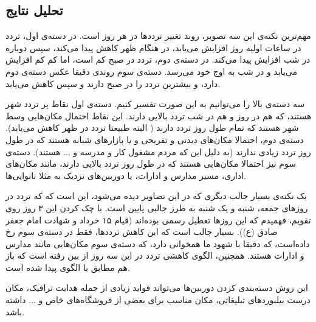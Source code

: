 \subsection{تحلیل نتایج}

مهم‌ترین نکته‌ی این سه تصویر، روند تغییر تردد‌ها در هر روز است. در دسته‌ی اول، 
تردد در ساعات اولیه روز افزایش می‌یابد، در هنگام ظهر کاهش پیدا می‌کند، سپس دوباره در 
شب افزایش پیدا می‌کند. در دسته‌ی دوم، تردد در صبح کم است، اما کم کم افزایش می‌یابد و در شب 
به اوج خود می‌رسد. دسته‌ی سوم روندی دقیقا عکس دسته‌ی دوم دارد، و بیشترین تردد را در صبح 
دارند و سپس کاهش می‌یابد. 

سه دسته‌ی بالا را می‌توانیم به این صورت تفسیر کنیم. دسته‌ی اول نقاط پر تردد شهر هستند، که هم در روز 
و هم در شب تردد بالایی دارند. این نقاط احتمال مکان‌هایی وسط شهر هستند که تمام 
طول روز تردد دارند ( البته طبیعتا تردد در ظهر کاهش می‌یابد). 
دسته‌ی دوم، احتمالا مکان‌های دیدنی و تفریحی و یا بازار‌های شبانه هستند 
که در طول روز تردد زیادی ندارند (به دلیل این که مردم مشغول کار و مدرسه و ... هستند). 
دسته‌ی سوم نیز احتمالا مکان‌هایی هستند که در طول روز تردد بالایی دارند، مانند مکان‌های اداری، مسیر مدارس و ادارات، یا دوربین‌های نزدیک به مثلا نانوایی‌ها. 

یک نکته‌ی بسیار جالب دیگری که در این تصاویر دیده می‌شود، این است که که تردد 
در روز‌های جمعه، شنبه و یک شنبه به طرز جالبی پایین است. با چک کردن این ۳ روز روی تقویم، فهمیدم که این روز‌ها 
تعطیل رسمی بوده‌اند (قیام ۱۵ خرداد و شهادت امام جعفر صادق (ع)). بسیار جالب است که این کاهش 
ترددها، فقط در دسته‌ی سوم رخ داده‌است، که دقیقا با شهود ما همخوانی دارد، که دسته‌ی سوم مکان‌هایی 
مانند مدارس و ادارات هستند. همچنین، الگوی کاهشی تردد در این سه روز از بین رفته‌ است 
که باز هم مطابق با الگوی پیدا شده است. 


این روش دسته‌بندی کردن دوربین‌ها می‌تواند فواید زیادی از جمله هدایت ترافیک، 
مکان درست بیلبوردهای  تبلیغاتی، مکان مناسب برای بعضی از فروشگاه‌های خاص و ... داشته باشد.